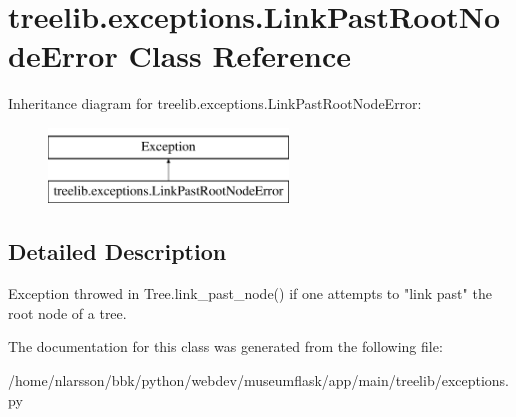\hypertarget{classtreelib_1_1exceptions_1_1LinkPastRootNodeError}{}\section{treelib.\+exceptions.\+Link\+Past\+Root\+Node\+Error Class Reference}
\label{classtreelib_1_1exceptions_1_1LinkPastRootNodeError}
Inheritance diagram for treelib.\+exceptions.\+Link\+Past\+Root\+Node\+Error\+:\begin{figure}[H]
\begin{center}
\leavevmode
\includegraphics[height=2.000000cm]{classtreelib_1_1exceptions_1_1LinkPastRootNodeError}
\end{center}
\end{figure}


\subsection{Detailed Description}
\begin{DoxyVerb}Exception throwed in Tree.link_past_node() if one attempts
to "link past" the root node of a tree.
\end{DoxyVerb}
 

The documentation for this class was generated from the following file\+:\begin{DoxyCompactItemize}
\item 
/home/nlarsson/bbk/python/webdev/museumflask/app/main/treelib/exceptions.\+py\end{DoxyCompactItemize}
